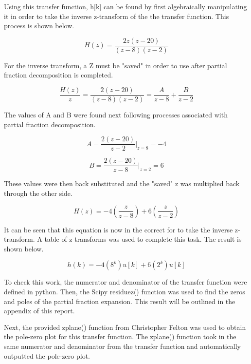 \documentclass[12pt, titlepage]{article}
\begin{document}
    Using this transfer function, h[k] can be found by first algebraically manipulating it in order to take the inverse z-transform of the the transfer function.  This process is shown below.
    
    \begin{equation}
        H(z) = \frac{2z(z-20)}{(z-8)(z-2)}
    \end{equation}
    
    For the inverse transform, a Z must be "saved" in order to use after partial fraction decomposition is completed.
    
    \begin{equation}
        \frac{H(z)}{z} = \frac{2(z-20)}{(z-8)(z-2)} = \frac{A}{z-8} + \frac{B}{z-2}
    \end{equation}
    
    The values of A and B were found next following processes associated with partial fraction decomposition.
    
    \begin{equation}
        A = \frac{2(z-20)}{z-2}\biggr\rvert_{z=8} = -4
    \end{equation}
    
    \begin{equation}
        B = \frac{2(z-20)}{z-8}\biggr\rvert_{z=2} = 6
    \end{equation}
    
    These values were then back substituted and the "saved" z was multiplied back through the other side.
    
    \begin{equation}
        H(z) = -4(\frac{z}{z-8})+6(\frac{z}{z-2})
    \end{equation}
    
    It can be seen that this equation is now in the correct for to take the inverse z-transform.  A table of z-transforms was used to complete this task.  The result is shown below.
    
    \begin{equation}
        h(k) = -4(8^k)u[k] + 6(2^k)u[k]
    \end{equation}
    
    To check this work, the numerator and denominator of the transfer function were defined in python.  Then, the Scipy residuez() function was used to find the zeros and poles of the partial fraction expansion.  This result will be outlined in the appendix of this report.
    
    Next, the provided zplane() function from Christopher Felton was used to obtain the pole-zero plot for this transfer function.  The zplane() function took in the same numerator and denominator from the transfer function and automatically outputted the pole-zero plot.
    
\end{document}
